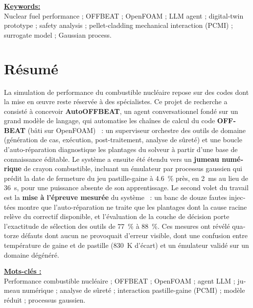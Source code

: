 \documentclass[12pt,a4paper]{report}
\begin{document}
\vspace{0.35cm}
\noindent\textbf{\underline{Keywords:}}\\[2pt]
Nuclear fuel performance ; OFFBEAT ; OpenFOAM ; LLM agent ; digital-twin
prototype ;
safety analysis ; pellet-cladding mechanical interaction (PCMI) ;
surrogate model ; Gaussian process.

\vspace{0.55cm}

\section*{Résumé}
\begin{otherlanguage}{french}

\noindent
La simulation de performance du combustible nucléaire repose sur des codes dont
la mise en \oe uvre reste réservée à des spécialistes. Ce projet de recherche a
consisté à concevoir \textbf{AutoOFFBEAT}, un agent conversationnel fondé sur un
grand modèle de langage, qui automatise les chaînes de calcul du code
\textbf{OFFBEAT} (bâti sur OpenFOAM)~ : un superviseur orchestre des outils de
domaine (génération de cas, exécution, post-traitement, analyse de sûreté) et
une boucle d'auto-réparation diagnostique les plantages du solveur à partir
d'une base de connaissance éditable. Le système a ensuite été étendu vers un
\textbf{jumeau numérique} de crayon combustible, incluant un émulateur par
processus gaussien qui prédit la date de fermeture du jeu pastille-gaine à
\SI{4.6}{\percent} près, en \SI{2}{\milli\second} au lieu de \SI{36}{\second},
pour une puissance absente de son apprentissage. Le second volet du travail est
la \textbf{mise à l'épreuve mesurée} du système~ : un banc de douze fautes
injectées montre que l'auto-réparation ne traite que les plantages dont la cause
racine relève du correctif disponible, et l'évaluation de la couche de décision
porte l'exactitude de sélection des outils de \SI{77}{\percent} à
\SI{88}{\percent}. Ces mesures ont révélé quatorze défauts dont aucun ne
provoquait d'erreur visible, dont une confusion entre température de gaine et
de pastille (\SI{830}{\kelvin} d'écart) et un émulateur validé sur un domaine
dégénéré.

\vspace{0.35cm}
\noindent\textbf{\underline{Mots-clés :}}\\[2pt]
Performance combustible nucléaire ; OFFBEAT ; OpenFOAM ; agent LLM ;
jumeau numérique ; analyse de sûreté ; interaction pastille-gaine (PCMI) ;
modèle réduit ; processus gaussien.

\end{otherlanguage}
\end{document}
